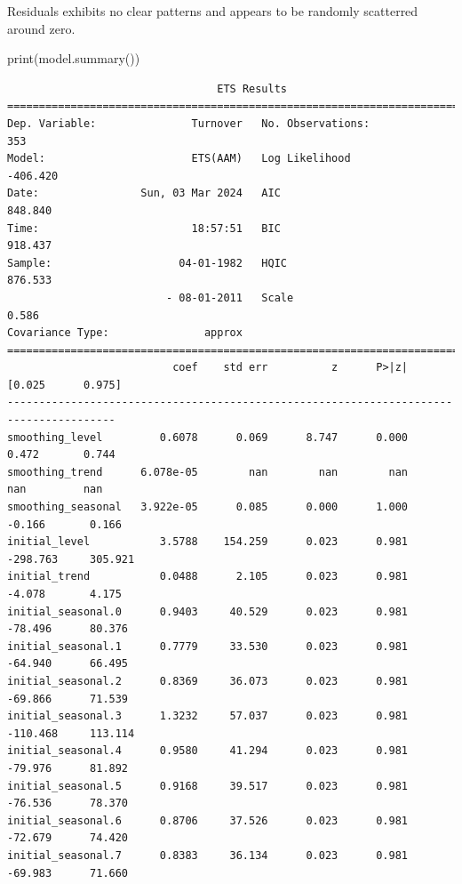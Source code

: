 \documentclass[
  11pt,
]{article}
\newenvironment{Shaded}{\begin{snugshade}}{\end{snugshade}}
\newcommand{\BuiltInTok}[1]{\textcolor[rgb]{0.00,0.23,0.31}{#1}}
\newcommand{\NormalTok}[1]{\textcolor[rgb]{0.00,0.23,0.31}{#1}}
\begin{document}
Residuals exhibits no clear patterns and appears to be randomly
scatterred around zero.

\begin{Shaded}
\begin{Highlighting}[]
\BuiltInTok{print}\NormalTok{(model.summary())}
\end{Highlighting}
\end{Shaded}

\begin{verbatim}
                                 ETS Results                                  
==============================================================================
Dep. Variable:               Turnover   No. Observations:                  353
Model:                       ETS(AAM)   Log Likelihood                -406.420
Date:                Sun, 03 Mar 2024   AIC                            848.840
Time:                        18:57:51   BIC                            918.437
Sample:                    04-01-1982   HQIC                           876.533
                         - 08-01-2011   Scale                            0.586
Covariance Type:               approx                                         
=======================================================================================
                          coef    std err          z      P>|z|      [0.025      0.975]
---------------------------------------------------------------------------------------
smoothing_level         0.6078      0.069      8.747      0.000       0.472       0.744
smoothing_trend      6.078e-05        nan        nan        nan         nan         nan
smoothing_seasonal   3.922e-05      0.085      0.000      1.000      -0.166       0.166
initial_level           3.5788    154.259      0.023      0.981    -298.763     305.921
initial_trend           0.0488      2.105      0.023      0.981      -4.078       4.175
initial_seasonal.0      0.9403     40.529      0.023      0.981     -78.496      80.376
initial_seasonal.1      0.7779     33.530      0.023      0.981     -64.940      66.495
initial_seasonal.2      0.8369     36.073      0.023      0.981     -69.866      71.539
initial_seasonal.3      1.3232     57.037      0.023      0.981    -110.468     113.114
initial_seasonal.4      0.9580     41.294      0.023      0.981     -79.976      81.892
initial_seasonal.5      0.9168     39.517      0.023      0.981     -76.536      78.370
initial_seasonal.6      0.8706     37.526      0.023      0.981     -72.679      74.420
initial_seasonal.7      0.8383     36.134      0.023      0.981     -69.983      71.660

\end{verbatim}
\end{document}
